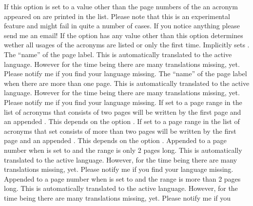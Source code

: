 \documentclass[load-preamble+,scrartcl={DIV10}]{cnltx-doc}
\begin{document}
\begin{options}
    If this option is set to a value other than  the page numbers
    of the an acronym appeared on are printed in the list.  Please note that
    this is an experimental feature and might fail in quite a number of cases.
    If you notice anything please send me an email!
    If the option  has any value other than
     this option determines wether all usages of the acronyms are
    listed or only the first time.  Implicitly sets .
    The ``name'' of the page label.  This is automatically translated to the
    active language. However for the time being there are many translations
    missing, yet.  Please notify me if you find your language missing.
    The ``name'' of the page label when there are more than
    one page.  This is automatically translated to the active language.
    However for the time being there are many translations missing, yet.
    Please notify me if you find your language missing.
    If set to  a page range in the list of
    acronyms that consists of two pages will be written by the first page and
    an appended . This depends on the option .
    If set to  a page range in the list of
    acronyms that set consists of more than two pages will be written by the
    first page and an appended . This depends on the option
    .
    Appended to a page number when 
    is set to  and the range is only 2 pages long.  This is
    automatically translated to the active language.  However, for the time
    being there are many translations missing, yet.  Please notify me if you
    find your language missing.
    Appended to a page number when 
    is set to  and the range is more than 2 pages long.  This is
    automatically translated to the active language.  However, for the time
    being there are many translations missing, yet.  Please notify me if you

\end{options}
\end{document}
